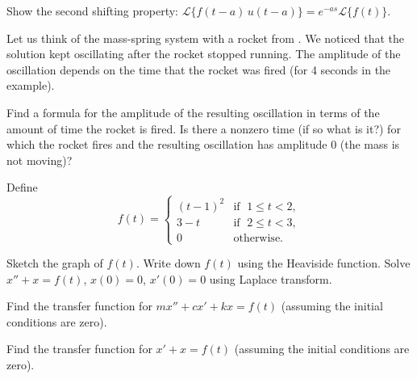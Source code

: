 \begin{exercise}
Show the second shifting property: 
$\mathcal{L} \bigl\{ f(t-a) \, u(t-a) \bigr\}
= e^{-as} \mathcal{L} \bigl\{ f(t) \bigr\}$.
\end{exercise}

\begin{exercise}
Let us think of the mass-spring system with a rocket from
.  We noticed that the solution kept oscillating
after the rocket stopped running.  The amplitude of the oscillation depends
on the time that the rocket was fired (for 4 seconds in the example).
\begin{tasks}
\task
Find a formula for the amplitude of the resulting oscillation
in terms of the amount of time the rocket is fired.
\task
 Is there
a nonzero time (if so what is it?)
for which the rocket fires and the resulting oscillation
has amplitude 0 (the mass is not moving)?
\end{tasks}
\end{exercise}

\begin{exercise}
Define
\begin{equation*}
f(t) =
\begin{cases}
{(t-1)}^2 & \text{if } \; 1 \leq t < 2, \\
3-t & \text{if } \; 2 \leq t < 3, \\
0 & \text{otherwise} .
\end{cases}
\end{equation*}
\begin{tasks}
\task Sketch the graph of $f(t)$.
\task Write down $f(t)$ using the Heaviside function.
\task Solve $x''+x=f(t)$, $x(0)=0$, $x'(0) = 0$ using Laplace transform.
\end{tasks}
\end{exercise}

\begin{exercise}
Find the transfer function for 
$m x'' + c x' + kx = f(t)$
(assuming the initial conditions are zero).
\end{exercise}

\begin{exercise}\ansMark%
Find the transfer function for 
$x' + x = f(t)$
(assuming the initial conditions are zero).
\end{exercise}

\setcounter{exercise}{100}

